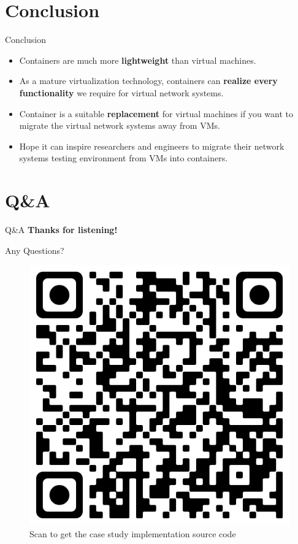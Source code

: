 \documentclass{beamer}
\begin{document}
\section{Conclusion}
\begin{frame}{Conclusion}
\begin{itemize}
\item Containers are much more \textbf{lightweight} than virtual machines.
\item As a mature virtualization technology, containers can \textbf{realize every functionality} we require for virtual network systems.
\item Container is a suitable \textbf{replacement} for virtual machines if you want to migrate the virtual network systems away from VMs.
\item Hope it can inspire researchers and engineers to migrate their network systems testing environment from VMs into containers.
\end{itemize}
\end{frame}

\section{Q\&A}
\begin{frame}{Q\&A}
\centering
\huge{\textbf{Thanks for listening!}}

Any Questions?
\begin{figure}[t!]
  \begin{center}
    \includegraphics[scale=0.075]{slide/img/source.png}
    \caption{Scan to get the case study implementation source code}
    \label{fig:source}
  \end{center}
\end{figure}
\end{frame}
\end{document}
